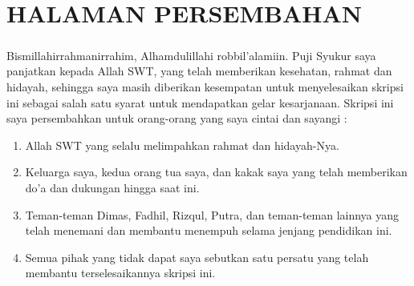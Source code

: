 \documentclass[../SKRIPSI_ALDZIKRI_DWIJAYANTO_PRATHAMA.tex]{subfiles}
\begin{document}
\chapter*{HALAMAN PERSEMBAHAN}
\begin{doublespace}
\paragraph*{}Bismillahirrahmanirrahim, Alhamdulillahi
robbil’alamiin. Puji Syukur saya panjatkan kepada Allah
SWT, yang telah memberikan kesehatan, rahmat dan hidayah,
sehingga saya masih diberikan kesempatan untuk
menyelesaikan skripsi ini sebagai salah satu syarat untuk
mendapatkan gelar kesarjanaan. Skripsi ini saya
persembahkan untuk orang-orang yang saya cintai dan sayangi :
\begin{enumerate}
  \item Allah SWT yang selalu melimpahkan rahmat dan hidayah-Nya.
  \item Keluarga saya, kedua orang tua saya, dan kakak saya yang telah
  memberikan do’a dan dukungan hingga saat ini.
  \item Teman-teman Dimas, Fadhil, Rizqul, Putra, dan
  teman-teman lainnya yang telah menemani dan membantu
  menempuh selama jenjang pendidikan ini.
  \item Semua pihak yang tidak dapat saya sebutkan satu persatu yang telah membantu terselesaikannya skripsi ini.
\end{enumerate}
\end{doublespace}
\end{document}
